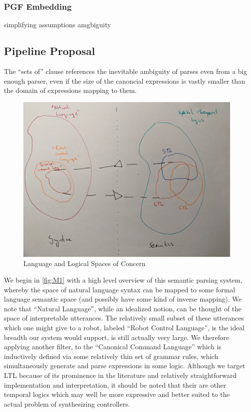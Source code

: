 \documentclass{article}
\begin{document}
\subsubsection{PGF Embedding}

simplifying assumptions
amgbiguity

\subsection{Pipeline Proposal}

The ``sets of'' clause
references the inevitable ambiguity of parses even from a big enough parser, even
if the size of the canoncial expressions is vastly smaller than the domain of
expressions mapping to them.

\begin{figure}[H]
\centering
\includegraphics[width=150mm]{pics/one.jpg}
\caption{Language and Logical Spaces of Concern} \label{fig:M1}
\end{figure}

We begin in \autoref{fig:M1} with a high level overview of this semantic parsing
system, whereby the space of natural language syntax can be mapped to some
formal language semantic space (and possibly have some kind of inverse mapping).
We note that ``Natural Language'', while an idealized notion, can be thought of
the space of interpretable utterances. The relatively small subset of these
utterances which one might give to a robot, labeled ``Robot Control Language'',
is the ideal breadth our system would support, is still actually very large. We
therefore applying another filter, to the ``Canonical Command Language'' which
is inductively defined via some relatively thin set of grammar rules, which
simultaneously generate and parse expressions in some logic. Although we target
LTL because of its prominence in the literature and relatively straightforward
implementation and interpretation, it should be noted that their are other
temporal logics which may well be more expressive and better suited to the
actual problem of synthesizing controllers.
\end{document}
